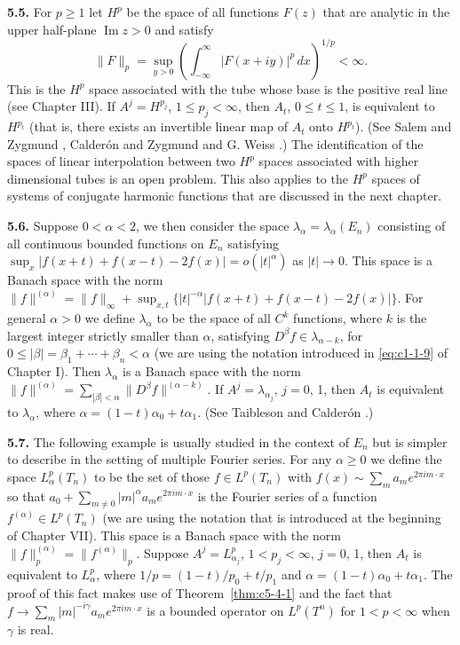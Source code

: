 \textbf{5.5.} For $p \geq 1$ let $H^{p}$ be the space of all functions
$F(z)$ that are analytic in the upper half-plane $\operatorname{Im} z > 0$ and
satisfy
\[
\|F\|_{p}=\sup_{y>0}\left(\int_{-\infty}^{\infty}|F(x+iy)|^{p}\,dx\right)^{1/p}<\infty.
\]
This is the $H^{p}$ space associated with the tube whose base is the positive
real line (see Chapter III). If $A^{j} = H^{p_{j}}$, $1 \leq p_{j} < \infty$,
then $A_{t}$, $0 \leq t \leq 1$, is equivalent to $H^{p_{t}}$ (that is, there
exists an invertible linear map of $A_{t}$ onto $H^{p_{t}}$). (See Salem and
Zygmund \cite{SalemZygmund1}, Calder\'on and Zygmund \cite{CalderonZygmund2}
and G. Weiss \cite{Weiss1}.) The identification of the spaces of linear
interpolation between two $H^{p}$ spaces associated with higher dimensional
tubes is an open problem. This also applies to the $H^{p}$ spaces of systems of
conjugate harmonic functions that are discussed in the next chapter.

\textbf{5.6.} Suppose $0 < \alpha < 2$, we then consider the space
$\lambda_{\alpha} = \lambda_{\alpha}(E_{n})$ consisting of all continuous
bounded functions on $E_{n}$ satisfying
$\sup_{x}|f(x + t) + f(x - t) - 2f(x)| = o(|t|^{\alpha})$ as $|t| \to 0$. This
space is a Banach space with the norm
$\|f\|^{(\alpha)} = \|f\|_{\infty} + \sup_{x,t}\{|t|^{-\alpha}|f(x + t) + f(x - t) - 2f(x)|\}$.
For general $\alpha > 0$ we define $\lambda_{\alpha}$ to be the space of all
$C^{k}$ functions, where $k$ is the largest integer strictly smaller than
$\alpha$, satisfying $D^{\beta}f \in \lambda_{\alpha-k}$, for
$0 \leq |\beta| = \beta_{1} + \cdots + \beta_{n} < \alpha$ (we are using the
notation introduced in \eqref{eq:c1-1-9} of Chapter I). Then $\lambda_{\alpha}$
is a Banach space with the norm
$\|f\|^{(\alpha)} = \sum_{|\beta| < \alpha}\|D^{\beta}f\|^{(\alpha-k)}$. If
$A^{j} = \lambda_{\alpha_{j}}$, $j = 0$, 1, then $A_{t}$ is equivalent to
$\lambda_{\alpha}$, where $\alpha = (1 - t)\alpha_{0} + t\alpha_{1}$. (See
Taibleson \cite{Taibleson1} and Calder\'on \cite{Calderon2}.)

\textbf{5.7.} The following example is usually studied in the context of
$E_{n}$ but is simpler to describe in the setting of multiple Fourier series.
For any $\alpha \geq 0$ we define the space $L_{\alpha}^{p}(T_{n})$ to be the
set of those $f \in L^{p}(T_{n})$ with
$f(x) \sim \sum_{m}a_{m}e^{2\pi im \cdot x}$ so that
$a_{0} + \sum_{m \neq 0}|m|^{\alpha}a_{m}e^{2\pi im \cdot x}$ is the Fourier
series of a function $f^{(\alpha)} \in L^{p}(T_{n})$ (we are using the
notation that is introduced at the beginning of Chapter VII). This space is a
Banach space with the norm $\|f\|_{p}^{(\alpha)} = \|f^{(\alpha)}\|_{p}$.
Suppose $A^{j} = L_{\alpha_{j}}^{p}$, $1 < p_{j} < \infty$, $j = 0$, 1, then
$A_{t}$ is equivalent to $L_{\alpha}^{p}$, where
$1/p = (1 - t)/p_{0} + t/p_{1}$ and $\alpha = (1 - t)\alpha_{0} + t\alpha_{1}$.
The proof of this fact makes use of Theorem~\ref{thm:c5-4-1} and the fact that
$f \to \sum_{m}|m|^{-i\gamma}a_{m}e^{2\pi im \cdot x}$ is a bounded operator on
$L^{p}(T^{n})$ for $1 < p < \infty$ when $\gamma$ is real.

